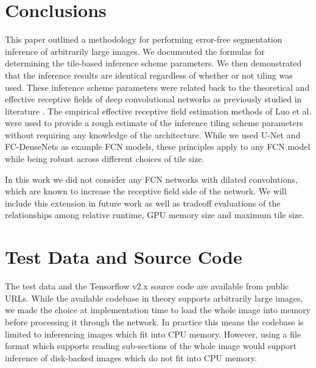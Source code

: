 \documentclass[runningheads]{llncs}
\newif\ifcamera
\begin{document}
\section{Conclusions}
\label{conclusion}

This paper outlined a methodology for performing error-free segmentation inference of arbitrarily large images. 
We documented the formulas for determining the tile-based inference scheme parameters. We then demonstrated that the inference results are identical regardless of whether or not tiling was used. These inference scheme parameters were related back to the theoretical and effective receptive fields of deep convolutional networks as previously studied in literature \cite{Luo2016}. The empirical effective receptive field estimation methods of Luo et al. \cite{Luo2016} were used to provide a rough estimate of the inference tiling scheme parameters without requiring any knowledge of the architecture.
While we used U-Net and FC-DenseNets as example FCN models, these principles apply to any FCN model while being robust across different choices of tile size. 

In this work we did not consider any FCN networks with dilated convolutions, which are known to increase the receptive field side of the network. We will include this extension in future work as well as tradeoff evaluations of the relationships among relative runtime, GPU memory size and maximum tile size.




\section{Test Data and Source Code}
The test data and the Tensorflow v2.x source code are available from public URLs\ifcamera\footnote{
\url{https://isg.nist.gov/deepzoomweb/data/stemcellpluripotency} 
\url{https://github.com/usnistgov/semantic-segmentation-unet/tree/ooc-inference}.}\fi.
While the available codebase in theory supports arbitrarily large images, we made the choice at implementation time to load the whole image into memory before processing it through the network. In practice this means the codebase is limited to inferencing images which fit into CPU memory. However, using a file format which supports reading sub-sections of the whole image would support inference of disk-backed images which do not fit into CPU memory. 
\end{document}
